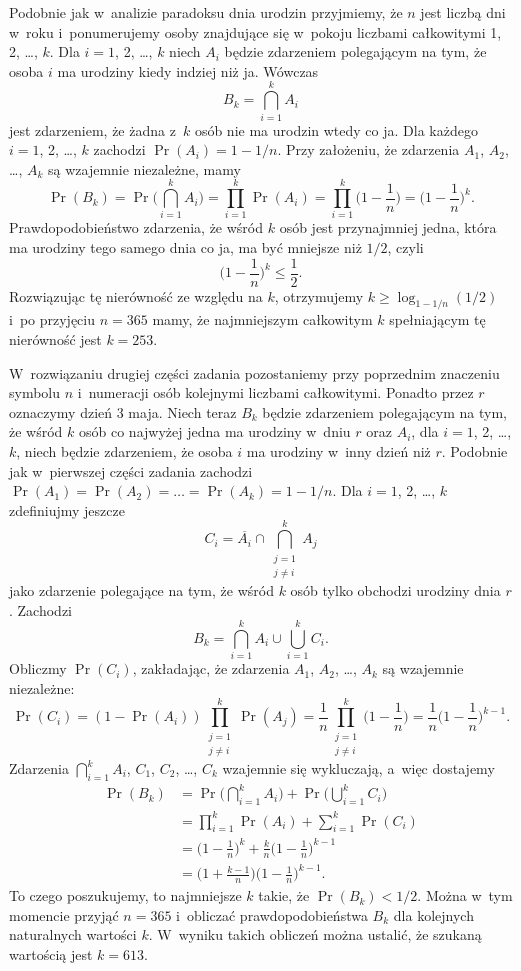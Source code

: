 
\exercise %
Podobnie jak w~analizie paradoksu dnia urodzin przyjmiemy, że $n$ jest liczbą dni w~roku i~ponumerujemy osoby znajdujące się w~pokoju liczbami całkowitymi 1, 2, \dots, $k$.
Dla $i=1$, 2, \dots, $k$ niech $A_i$ będzie zdarzeniem polegającym na tym, że osoba $i$ ma urodziny kiedy indziej niż ja.
Wówczas
\[
	B_k = \bigcap_{i=1}^kA_i
\]
jest zdarzeniem, że żadna z~$k$ osób nie ma urodzin wtedy co ja.
Dla każdego $i=1$, 2, \dots, $k$ zachodzi $\Pr(A_i)=1-1/n$.
Przy założeniu, że zdarzenia $A_1$, $A_2$, \dots, $A_k$ są wzajemnie niezależne, mamy
\[
	\Pr(B_k) = \Pr\biggl(\bigcap_{i=1}^kA_i\biggr) = \prod_{i=1}^k\Pr(A_i) = \prod_{i=1}^k\biggl(1-\frac{1}{n}\biggr) = \biggl(1-\frac{1}{n}\biggr)^k.
\]
Prawdopodobieństwo zdarzenia, że wśród $k$ osób jest przynajmniej jedna, która ma urodziny tego samego dnia co ja, ma być mniejsze niż $1/2$, czyli
\[
	\biggl(1-\frac{1}{n}\biggr)^k \le \frac{1}{2}.
\]
Rozwiązując tę nierówność ze względu na $k$, otrzymujemy $k\ge\log_{1-1/n}(1/2)$ i~po przyjęciu $n=365$ mamy, że najmniejszym całkowitym $k$ spełniającym tę nierówność jest $k=253$.

W~rozwiązaniu drugiej części zadania pozostaniemy przy poprzednim znaczeniu symbolu $n$ i~numeracji osób kolejnymi liczbami całkowitymi.
Ponadto przez $r$ oznaczymy dzień 3 maja.
Niech teraz $B_k$ będzie zdarzeniem polegającym na tym, że wśród $k$ osób co najwyżej jedna ma urodziny w~dniu $r$ oraz $A_i$, dla $i=1$, 2, \dots, $k$, niech będzie zdarzeniem, że osoba $i$ ma urodziny w~inny dzień niż $r$.
Podobnie jak w~pierwszej części zadania zachodzi $\Pr(A_1)=\Pr(A_2)=\dots=\Pr(A_k)=1-1/n$.
Dla $i=1$, 2, \dots, $k$ zdefiniujmy jeszcze
\[
	C_i = \overline{A_i}\cap\bigcap_{\substack{j=1\\j\ne i}}^kA_j
\]
jako zdarzenie polegające na tym, że wśród $k$ osób tylko  obchodzi urodziny dnia $r$.
Zachodzi
\[
	B_k = \bigcap_{i=1}^kA_i\cup\bigcup_{i=1}^kC_i.
\]
Obliczmy $\Pr(C_i)$, zakładając, że zdarzenia $A_1$, $A_2$, \dots, $A_k$ są wzajemnie niezależne:
\[
	\Pr(C_i) = (1-\Pr(A_i))\prod_{\substack{j=1\\j\ne i}}^k\Pr(A_j) = \frac{1}{n}\prod_{\substack{j=1\\j\ne i}}^k\biggl(1-\frac{1}{n}\biggr) = \frac{1}{n}\biggl(1-\frac{1}{n}\biggr)^{k-1}.
\]
Zdarzenia $\bigcap_{i=1}^kA_i$, $C_1$, $C_2$, \dots, $C_k$ wzajemnie się wykluczają, a~więc dostajemy
\begin{align*}
	\Pr(B_k) &= \Pr\biggl(\bigcap_{i=1}^kA_i\biggr)+\Pr\biggl(\bigcup_{i=1}^kC_i\biggr) \\
	&= \prod_{i=1}^k\Pr(A_i)+\sum_{i=1}^k\Pr(C_i) \\
	&= \biggl(1-\frac{1}{n}\biggr)^k+\frac{k}{n}\biggl(1-\frac{1}{n}\biggr)^{k-1} \\
	&= \biggl(1+\frac{k-1}{n}\biggr)\biggl(1-\frac{1}{n}\biggr)^{k-1}.
\end{align*}
To czego poszukujemy, to najmniejsze $k$ takie, że $\Pr(B_k)<1/2$.
Można w~tym momencie przyjąć $n=365$ i~obliczać prawdopodobieństwa $B_k$ dla kolejnych naturalnych wartości $k$.
W~wyniku takich obliczeń można ustalić, że szukaną wartością jest $k=613$.

